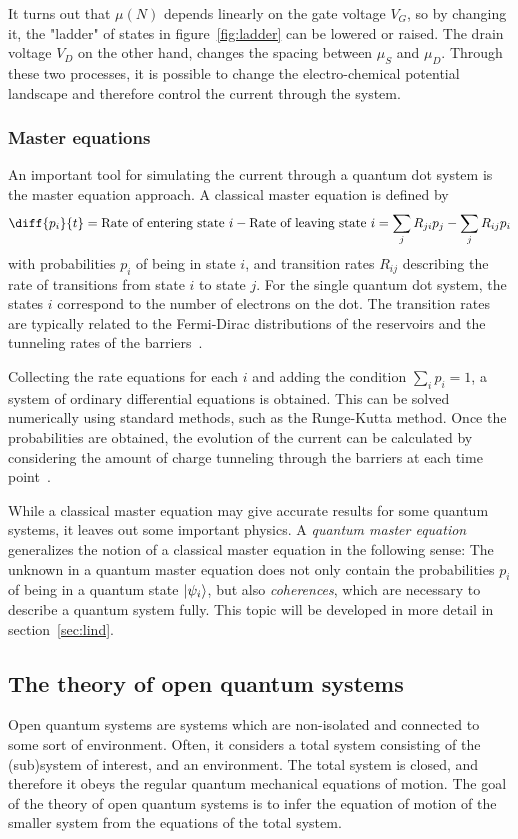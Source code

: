 \documentclass[../main.tex]{subfiles}
\begin{document}
It turns out that $\mu(N)$ depends linearly on the gate voltage $V_G$, so by changing it, the "ladder" of states in figure~\ref{fig:ladder} can be lowered or raised. The drain voltage $V_D$ on the other hand, changes the spacing between $\mu_S$ and $\mu_D$. Through these two processes, it is possible to change the electro-chemical potential landscape and therefore control the current through the system. 

\subsubsection{Master equations}
An important tool for simulating the current through a quantum dot system is the master equation approach. A classical master equation is defined by
\begin{equation}\label{master}
    \diff{p_i}{t} = \text{Rate of entering state } i - \text{Rate of leaving state } i = \sum_j R_{ji}p_j  - \sum_j R_{ij}p_i
\end{equation}
with probabilities $p_i$ of being in state $i$, and transition rates $R_{ij}$ describing the rate of transitions from state $i$ to state $j$. For the single quantum dot system, the states $i$ correspond to the number of electrons on the dot. The transition rates are typically related to the Fermi-Dirac distributions of the reservoirs and the tunneling rates of the barriers~\cite{transport}.

Collecting the rate equations for each $i$ and adding the condition $\sum_i p_i = 1$, a system of ordinary differential equations is obtained. This can be solved numerically using standard methods, such as the Runge-Kutta method. Once the probabilities are obtained, the evolution of the current can be calculated by considering the amount of charge tunneling through the barriers at each time point~\cite{transport}.

While a classical master equation may give accurate results for some quantum systems, it leaves out some important physics. A \textit{quantum master equation} generalizes the notion of a classical master equation in the following sense: The unknown in a quantum master equation does not only contain the probabilities $p_i$ of being in a quantum state $\ket{\psi_i}$, but also \textit{coherences}, which are necessary to describe a quantum system fully. This topic will be developed in more detail in section~\ref{sec:lind}.
\subsection{The theory of open quantum systems}
Open quantum systems are systems which are non-isolated and connected to some sort of environment. Often, it considers a total system consisting of the (sub)system of interest, and an environment. The total system is closed, and therefore it obeys the regular quantum mechanical equations of motion. The goal of the theory of open quantum systems is to infer the equation of motion of the smaller system from the equations of the total system. 
\end{document}
